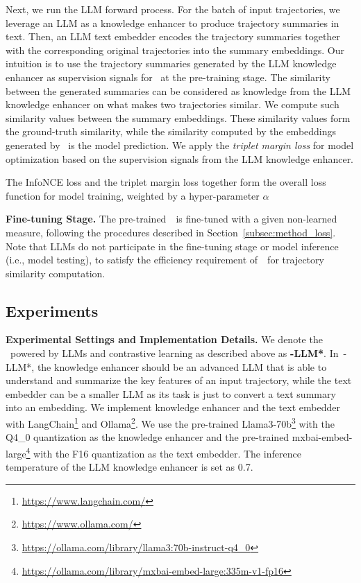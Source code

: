 Next, we run the LLM forward process. 
For the batch of input trajectories, we leverage an LLM as a knowledge enhancer to produce trajectory summaries in text.
Then, an LLM text embedder encodes the trajectory summaries together with the corresponding original trajectories into the summary embeddings. 
Our intuition is to use the trajectory summaries generated by the LLM knowledge enhancer as supervision signals for \model\ at the pre-training stage. The similarity between the generated summaries can be considered as knowledge from the LLM knowledge enhancer on what makes two trajectories similar.
We compute such similarity values between the summary embeddings. These similarity values form the ground-truth similarity, while the  similarity computed by the embeddings generated by \model\ is the model prediction. We apply the \emph{triplet margin loss} for model optimization based on the supervision signals from the LLM knowledge enhancer.


The InfoNCE loss and the triplet margin loss   together form the overall loss function for model training, weighted by a hyper-parameter $\alpha$






\textbf{Fine-tuning Stage.} 
The pre-trained~\model\  is fine-tuned with a given non-learned measure, following the procedures described in Section~\ref{subsec:method_loss}. 
Note that LLMs do not participate in the fine-tuning stage or model inference (i.e., model testing), to satisfy the efficiency requirement of~\model\ for trajectory similarity computation.


\subsection{Experiments}\label{subsec:llm_exp}

\textbf{Experimental Settings and Implementation Details.} 
We denote the \model\ powered by LLMs and contrastive learning as described above as \textbf{\model-LLM*}.
In~\model-LLM*, the knowledge enhancer should be an advanced LLM that is able to understand and summarize the key features of an input trajectory, while the text embedder can be a smaller LLM as its task is just to convert a text summary into an embedding. We implement knowledge enhancer and the text embedder with LangChain\footnote{\url{https://www.langchain.com/}} and Ollama\footnote{\url{https://www.ollama.com/}}. We use the pre-trained Llama3-70b\footnote{\url{https://ollama.com/library/llama3:70b-instruct-q4_0}} with the Q4\_0 quantization as the knowledge enhancer and the pre-trained 
mxbai-embed-large\footnote{\url{https://ollama.com/library/mxbai-embed-large:335m-v1-fp16}} with the F16 quantization as the text embedder. The inference temperature of the LLM knowledge enhancer is set as 0.7.


